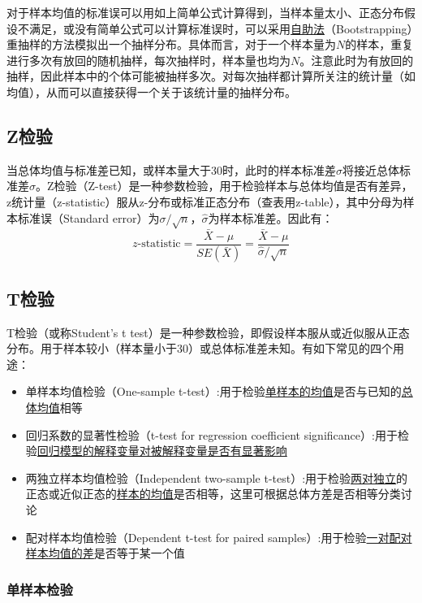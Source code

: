 \documentclass[11pt]{article}
\begin{document}
对于样本均值的标准误可以用如上简单公式计算得到，当样本量太小、正态分布假设不满足，或没有简单公式可以计算标准误时，可以采用\uline{自助法}（Bootstrapping）重抽样的方法模拟出一个抽样分布。具体而言，对于一个样本量为$N$的样本，重复进行多次有放回的随机抽样，每次抽样时，样本量也均为$N$。注意此时为有放回的抽样，因此样本中的个体可能被抽样多次。对每次抽样都计算所关注的统计量（如均值），从而可以直接获得一个关于该统计量的抽样分布。

\subsection{Z检验}

当总体均值与标准差已知，或样本量大于30时，此时的样本标准差$\hat{\sigma}$将接近总体标准差$\sigma$。Z检验（Z-test）是一种参数检验，用于检验样本与总体均值是否有差异，z统计量（z-statistic）服从z-分布或标准正态分布（查表用z-table），其中分母为样本标准误（Standard error）为$\sigma/\sqrt{n}$，$\hat{\sigma}$为样本标准差。因此有：
\begin{equation*}
    z\text{-statistic} = \frac{\bar{X}-\mu}{SE(\bar{X})} = \frac{\bar{X} - \mu}{\hat{\sigma}/\sqrt{n}}
\end{equation*}

\subsection{T检验}

T检验（或称Student's t test）是一种参数检验，即假设样本服从或近似服从正态分布。用于样本较小（样本量小于30）或总体标准差未知。有如下常见的四个用途：
\begin{itemize}
    \item 单样本均值检验（One-sample t-test）:用于检验\uline{单样本的均值}是否与已知的\uline{总体均值}相等
    \item 回归系数的显著性检验（t-test for regression coefficient significance）:用于检验\uline{回归模型的解释变量对被解释变量是否有显著影响}
    \item 两独立样本均值检验（Independent two-sample t-test）:用于检验\uline{两对独立}的正态或近似正态的\uline{样本的均值}是否相等，这里可根据总体方差是否相等分类讨论
    \item 配对样本均值检验（Dependent t-test for paired samples）:用于检验\uline{一对配对样本均值的差}是否等于某一个值
\end{itemize}

\subsubsection{单样本检验}
\end{document}
